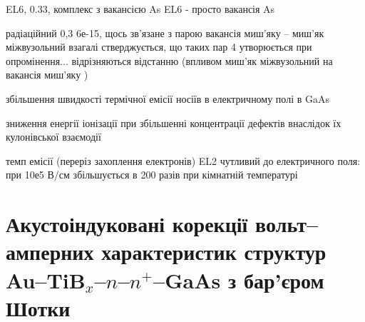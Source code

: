 \documentclass[a4paper,14pt,oneside,openany]{memoir}
\begin{document}
EL6, 0.33, комплекс з вакансією As \cite{EL6:Richter}
EL6 - просто вакансія As \cite{EL6:Schultz}

радіаційний 0,3 6е-15, щось зв'язане з парою вакансія миш'яку -- миш'як міжвузольний
взагалі стверджується, що таких пар 4 утворюється при опромінення... відрізняються відстанню (впливом миш'як міжвузольний на вакансія миш'яку )
\cite{Pons}

збільшення швидкості термічної емісії носіїв в електричному полі в GaAs \cite{Bulyarskii2000r,Makram}

зниження енергії іонізації при збільшенні концентрації дефектів внаслідок їх кулонівської взаємодії \cite{Stellmacher}

темп емісії (переріз захоплення електронів) EL2 чутливий до електричного поля: при 10е5 В/см збільшується в 200 разів при кімнатній температурі \cite{Bourgoin2001}





%




\section{Акустоіндуковані корекції вольт--амперних характеристик структур Au--TiB$_x$--$n$--$n^+$--GaAs з бар'єром Шотки\label{MSGA}}
\end{document}
